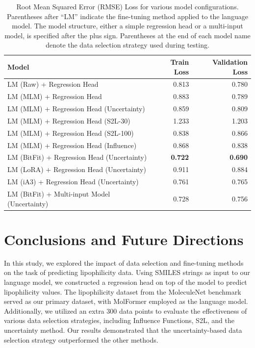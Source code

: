 \documentclass[11pt]{article}
\begin{document}
\begin{table}[t]
\centering
\begin{tabular}{lrr}
\toprule
\textbf{Model} & \textbf{Train Loss} & \textbf{Validation Loss} \\
\midrule
LM (Raw) + Regression Head & 0.813 & 0.780 \\
\midrule
LM (MLM) + Regression Head & 0.883 & 0.789 \\
LM (MLM) + Regression Head (Uncertainty) & 0.859 & 0.809 \\
LM (MLM) + Regression Head (S2L-30) & 1.233 & 1.203 \\
LM (MLM) + Regression Head (S2L-100) & 0.838 & 0.866 \\
LM (MLM) + Regression Head (Influence) & 0.868 & 0.838 \\
\midrule
LM (BitFit) + Regression Head (Uncertainty) & \textbf{0.722} & \textbf{0.690} \\
LM (LoRA) + Regression Head (Uncertainty) & 0.911 & 0.884 \\
LM (iA3) + Regression Head (Uncertainty) & 0.761 & 0.765 \\
\midrule
LM (BitFit) + Multi-input Model (Uncertainty) & 0.728 & 0.756 \\
\bottomrule
\end{tabular}
\caption{Root Mean Squared Error (RMSE) Loss for various model configurations. Parentheses after ``LM'' indicate the fine-tuning method applied to the language model. The model structure, either a simple regression head or a multi-input model, is specified after the plus sign. Parentheses at the end of each model name denote the data selection strategy used during testing.}
\label{tab:rmse_loss}
\end{table}

\section{Conclusions and Future Directions}

In this study, we explored the impact of data selection and fine-tuning methods on the task of predicting lipophilicity data. Using SMILES strings as input to our language model, we constructed a regression head on top of the model to predict lipophilicity values. The lipophilicity dataset from the MoleculeNet benchmark served as our primary dataset, with MolFormer employed as the language model. Additionally, we utilized an extra 300 data points to evaluate the effectiveness of various data selection strategies, including Influence Functions, S2L, and the uncertainty method. Our results demonstrated that the uncertainty-based data selection strategy outperformed the other methods.
\end{document}
